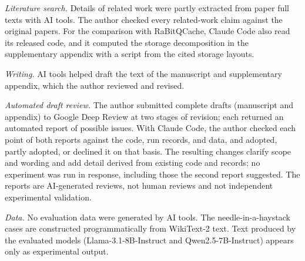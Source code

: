 \documentclass{article}
\begin{document}
\emph{Literature search.} Details of related work were partly extracted from paper full texts with AI
tools. The author checked every related-work claim against the original papers. For the comparison
with RaBitQCache, Claude Code also read its released code, and it computed the storage decomposition
in the supplementary appendix with a script from the cited storage layouts.

\emph{Writing.} AI tools helped draft the text of the manuscript and supplementary appendix, which the
author reviewed and revised.

\emph{Automated draft review.} The author submitted complete drafts (manuscript and
appendix) to Google Deep Review at two stages of revision; each returned an automated report
of possible issues. With Claude Code, the author checked each point of both reports against the code, run
records, and data, and adopted, partly adopted, or declined it on that basis. The resulting changes
clarify scope and wording and add detail derived from existing code and records; no experiment was run in
response, including those the second report suggested. The reports are AI-generated reviews, not human
reviews and not independent experimental validation.

\emph{Data.} No evaluation data were generated by AI tools. The needle-in-a-haystack cases are
constructed programmatically from WikiText-2 text. Text produced by the evaluated models
(Llama-3.1-8B-Instruct and Qwen2.5-7B-Instruct) appears only as experimental output.
\end{document}
